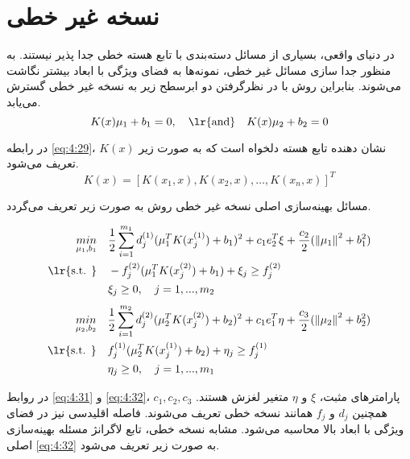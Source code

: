 \section{نسخه غیر خطی}\label{sec:4:5}
در دنیای واقعی، بسیاری از مسائل دسته‌بندی با تابع هسته خطی جدا پذیر نیستند. به منظور جدا سازی مسائل غیر خطی، نمونه‌ها به فضای ویژگی با ابعاد بیشتر نگاشت می‌شوند. بنابراین روش  با در نظرگرفتن دو ابرسطح زیر به نسخه غیر خطی گسترش می‌یابد.
\begin{equation}\label{eq:4:29}
K(x){{\mu}_{1}}+{{b}_{1}}=0, \quad \textrm{\lr{and}} \quad K(x){{\mu}_{2}}+{{b}_{2}}=0
\end{equation}

در رابطه \ref{eq:4:29}، $K(x)$  نشان دهنده تابع هسته دلخواه است که به صورت زیر تعریف می‌شود.
\begin{equation}\label{eq:4:30}
K(x) = [K(x_{1},x),K(x_{2},x),\dots,K(x_{n},x)]^{T}
\end{equation}

مسائل بهینه‌سازی اصلی نسخه غیر خطی روش  به صورت زیر تعریف می‌گردد.

\begin{equation}
\label{eq:4:31}
\begin{split}
\mathop{{ min}}\limits_{\mu_{1} ,b_{1}} \quad & \frac{1}{2}\sum\limits_{i=1}^{m_{1}}{d^{(1)}_{j}(\mu^{T}_{1}K(x^{(1)}_{j})+b_{1})^{2}}+c_{1}e_{2}^{T}\xi+\frac{c_{2}}{2}(\left\|\mu_{1}\right\|^{2}+b^{2}_{1}) \\
\textrm{\lr{s.t. }} \quad & -f^{(2)}_{j}(\mu^{T}_{1}K(x^{(2)}_{j}) + b_{1})+\xi_{j} \ge f^{(2)}_{j} \\
& \xi_{j} \ge 0,\quad j=1,...,m_{2}
\end{split}
\end{equation}
\begin{equation}
\label{eq:4:32}
\begin{split}
\mathop{{ min}}\limits_{\mu_{2} ,b_{2}} \quad & \frac{1}{2}\sum\limits_{i=1}^{m_{2}}{d^{(2)}_{j}(\mu^{T}_{2}K(x^{(2)}_{j})+b_{2})^{2}}+c_{1}e_{1}^{T}\eta+\frac{c_{3}}{2}(\left\|\mu_{2}\right\|^{2}+b^{2}_{2}) \\
\textrm{\lr{s.t. }} \quad & f^{(1)}_{j}(\mu^{T}_{2}K(x^{(1)}_{j})+b_{2})+\eta_{j} \ge f^{(1)}_{j} \\
& \eta_{j} \ge 0,\quad j=1,...,m_{1}
\end{split}
\end{equation}

در روابط \ref{eq:4:31} و \ref{eq:4:32}،  $c_{1},c_{2},c_{3}$ پارامترهای مثبت،  $\xi$ و  $\eta$ متغیر لغزش هستند. همچنین   $d_{j}$ و  $f_{j}$ همانند نسخه خطی تعریف می‌شوند. فاصله اقلیدسی نیز در فضای ویژگی با ابعاد بالا محاسبه می‌شود. مشابه نسخه خطی، تابع لاگرانژ مسئله بهینه‌سازی اصلی \ref{eq:4:32} به صورت زیر تعریف می‌شود.

